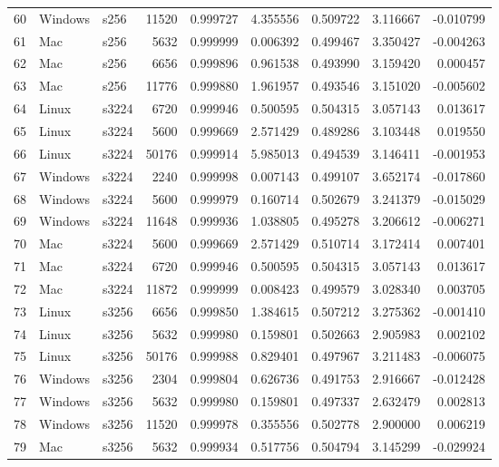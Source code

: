 \documentclass{IEEEtran}
\begin{document}
\begin{longtable}{rllrrrrrr}
  60 & Windows & s256 &   11520 & 0.999727 & 4.355556 & 0.509722 & 3.116667 & -0.010799 \\ 
  61 & Mac & s256 &    5632 & 0.999999 & 0.006392 & 0.499467 & 3.350427 & -0.004263 \\ 
  62 & Mac & s256 &    6656 & 0.999896 & 0.961538 & 0.493990 & 3.159420 & 0.000457 \\ 
  63 & Mac & s256 &   11776 & 0.999880 & 1.961957 & 0.493546 & 3.151020 & -0.005602 \\ 
  64 & Linux & s3224 &    6720 & 0.999946 & 0.500595 & 0.504315 & 3.057143 & 0.013617 \\ 
  65 & Linux & s3224 &    5600 & 0.999669 & 2.571429 & 0.489286 & 3.103448 & 0.019550 \\ 
  66 & Linux & s3224 &   50176 & 0.999914 & 5.985013 & 0.494539 & 3.146411 & -0.001953 \\ 
  67 & Windows & s3224 &    2240 & 0.999998 & 0.007143 & 0.499107 & 3.652174 & -0.017860 \\ 
  68 & Windows & s3224 &    5600 & 0.999979 & 0.160714 & 0.502679 & 3.241379 & -0.015029 \\ 
  69 & Windows & s3224 &   11648 & 0.999936 & 1.038805 & 0.495278 & 3.206612 & -0.006271 \\ 
  70 & Mac & s3224 &    5600 & 0.999669 & 2.571429 & 0.510714 & 3.172414 & 0.007401 \\ 
  71 & Mac & s3224 &    6720 & 0.999946 & 0.500595 & 0.504315 & 3.057143 & 0.013617 \\ 
  72 & Mac & s3224 &   11872 & 0.999999 & 0.008423 & 0.499579 & 3.028340 & 0.003705 \\ 
  73 & Linux & s3256 &    6656 & 0.999850 & 1.384615 & 0.507212 & 3.275362 & -0.001410 \\ 
  74 & Linux & s3256 &    5632 & 0.999980 & 0.159801 & 0.502663 & 2.905983 & 0.002102 \\ 
  75 & Linux & s3256 &   50176 & 0.999988 & 0.829401 & 0.497967 & 3.211483 & -0.006075 \\ 
  76 & Windows & s3256 &    2304 & 0.999804 & 0.626736 & 0.491753 & 2.916667 & -0.012428 \\ 
  77 & Windows & s3256 &    5632 & 0.999980 & 0.159801 & 0.497337 & 2.632479 & 0.002813 \\ 
  78 & Windows & s3256 &   11520 & 0.999978 & 0.355556 & 0.502778 & 2.900000 & 0.006219 \\ 
  79 & Mac & s3256 &    5632 & 0.999934 & 0.517756 & 0.504794 & 3.145299 & -0.029924 \\ 

\end{longtable}
\end{document}
